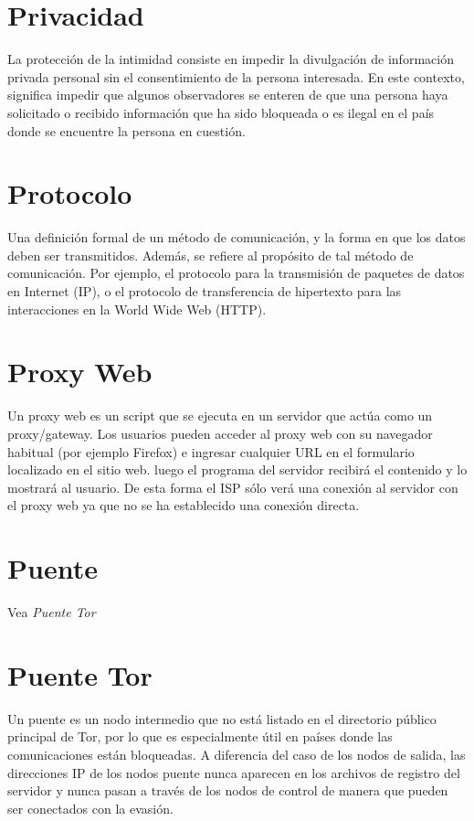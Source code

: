 \documentclass[10pt,a5paper,twoside,,]{book}
\begin{document}
\section{Privacidad}\label{privacidad}

La protección de la intimidad consiste en impedir la divulgación de
información privada personal sin el consentimiento de la persona
interesada. En este contexto, significa impedir que algunos observadores
se enteren de que una persona haya solicitado o recibido información que
ha sido bloqueada o es ilegal en el país donde se encuentre la persona
en cuestión.

\section{Protocolo}\label{protocolo}

Una definición formal de un método de comunicación, y la forma en que
los datos deben ser transmitidos. Además, se refiere al propósito de tal
método de comunicación. Por ejemplo, el protocolo para la transmisión de
paquetes de datos en Internet (IP), o el protocolo de transferencia de
hipertexto para las interacciones en la World Wide Web (HTTP).

\section{Proxy Web}\label{proxy-web}

Un proxy web es un script que se ejecuta en un servidor que actúa como
un proxy/gateway. Los usuarios pueden acceder al proxy web con su
navegador habitual (por ejemplo Firefox) e ingresar cualquier URL en el
formulario localizado en el sitio web. luego el programa del servidor
recibirá el contenido y lo mostrará al usuario. De esta forma el ISP
sólo verá una conexión al servidor con el proxy web ya que no se ha
establecido una conexión directa.

\section{Puente}\label{puente}

Vea \emph{Puente Tor}

\section{Puente Tor}\label{puente-tor}

Un puente es un nodo intermedio que no está listado en el directorio
público principal de Tor, por lo que es especialmente útil en países
donde las comunicaciones están bloqueadas. A diferencia del caso de los
nodos de salida, las direcciones IP de los nodos puente nunca aparecen
en los archivos de registro del servidor y nunca pasan a través de los
nodos de control de manera que pueden ser conectados con la evasión.
\end{document}
